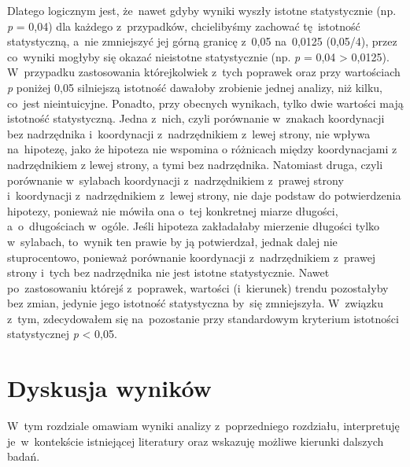 \documentclass[licencjacka]{pracamgr_Kogni}
\begin{document}
    Dlatego logicznym jest, że~nawet gdyby wyniki wyszły istotne statystycznie (np. \textit{p} = 0,04) dla każdego z~przypadków, chcielibyśmy zachować tę~istotność statystyczną, a~nie zmniejszyć jej górną granicę z~0,05 na~0,0125 (0,05/4), przez co~wyniki mogłyby się okazać nieistotne statystycznie (np. \textit{p} = 0,04 > 0,0125).
    W~przypadku zastosowania którejkolwiek z~tych poprawek oraz przy wartościach \textit{p} poniżej 0,05 silniejszą istotność dawałoby zrobienie jednej analizy, niż kilku, co~jest nieintuicyjne.
    Ponadto, przy obecnych wynikach, tylko dwie wartości mają istotność statystyczną.
    Jedna z~nich, czyli porównanie w~znakach koordynacji bez nadrzędnika i~koordynacji z~nadrzędnikiem z~lewej strony, nie wpływa na~hipotezę, jako że hipoteza nie wspomina o różnicach między koordynacjami z nadrzędnikiem z lewej strony, a tymi bez nadrzędnika.
    Natomiast druga, czyli porównanie w~sylabach koordynacji z~nadrzędnikiem z~prawej strony i~koordynacji z~nadrzędnikiem z~lewej strony, nie daje podstaw do potwierdzenia hipotezy, ponieważ nie mówiła ona o~tej konkretnej miarze długości, a~o~długościach w~ogóle. 
    Jeśli hipoteza zakładałaby mierzenie długości tylko w~sylabach, to~wynik ten prawie by ją potwierdzał, jednak dalej nie stuprocentowo, ponieważ porównanie koordynacji z~nadrzędnikiem z~prawej strony i~tych bez nadrzędnika nie jest istotne statystycznie.
    Nawet po~zastosowaniu którejś z~poprawek, wartości (i~kierunek) trendu pozostałyby bez zmian, jedynie jego istotność statystyczna by~się zmniejszyła.
    W~związku z~tym, zdecydowałem się na~pozostanie przy standardowym kryterium istotności statystycznej \textit{p} < 0,05.
    \chapter{Dyskusja wyników}\label{ch:dyskusja-wynikow}
    W~tym rozdziale omawiam wyniki analizy z~poprzedniego rozdziału, interpretuję je~w~kontekście istniejącej literatury oraz wskazuję możliwe kierunki dalszych badań.
\end{document}
